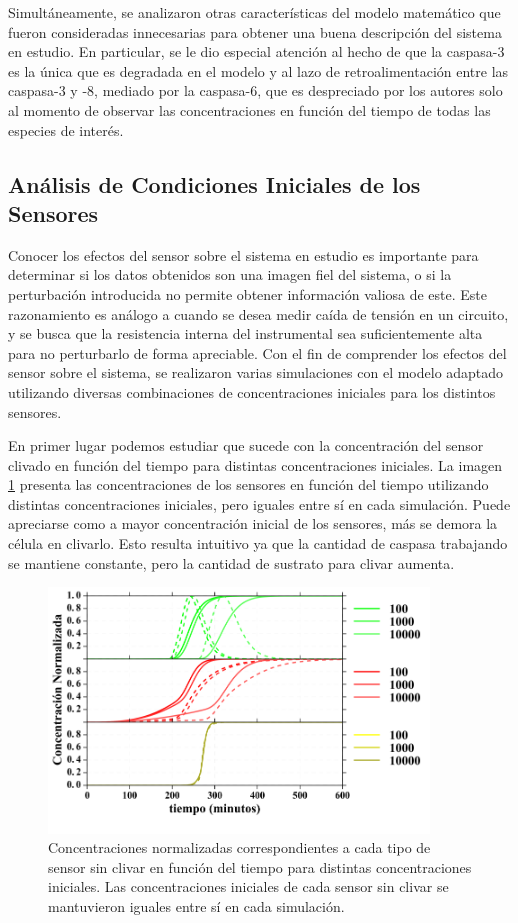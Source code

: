 Simultáneamente, se analizaron otras características del modelo matemático que fueron consideradas innecesarias para obtener una buena descripción del sistema en estudio. En particular, se le dio especial atención al hecho de que la caspasa-3 es la única que es degradada en el modelo y al lazo de retroalimentación entre las caspasa-3 y -8, mediado por la caspasa-6, que es despreciado por los autores solo al momento de observar las concentraciones en función del tiempo de todas las especies de interés.


\subsection{Análisis de Condiciones Iniciales de los Sensores}

Conocer los efectos del sensor sobre el sistema en estudio es importante para determinar si los datos obtenidos son una imagen fiel del sistema, o si la perturbación introducida no permite obtener información valiosa de este. Este razonamiento es análogo a cuando se desea medir caída de tensión en un circuito, y se busca que la resistencia interna del instrumental sea suficientemente alta para no perturbarlo de forma apreciable. Con el fin de comprender los efectos del sensor sobre el sistema, se realizaron varias simulaciones con el modelo adaptado utilizando diversas combinaciones de concentraciones iniciales para los distintos sensores.

En primer lugar podemos estudiar que sucede con la concentración del sensor clivado en función del tiempo para distintas concentraciones iniciales. La imagen \ref{fig:sweepcc} presenta las concentraciones de los sensores en función del tiempo utilizando distintas concentraciones iniciales, pero iguales entre sí en cada simulación. Puede apreciarse como a mayor concentración inicial de los sensores, más se demora la célula en clivarlo. Esto resulta intuitivo ya que la cantidad de caspasa trabajando se mantiene constante, pero la cantidad de sustrato para clivar aumenta.

\begin{figure}
    \centering
    \includegraphics[width=0.9\textwidth]{./img/Cap3/SweepAll.png}
    \caption{Concentraciones normalizadas correspondientes a cada tipo de sensor sin clivar en función del tiempo para distintas concentraciones iniciales. Las concentraciones iniciales de cada sensor sin clivar se mantuvieron iguales entre sí en cada simulación.}
    \label{fig:sweepcc}
\end{figure}

